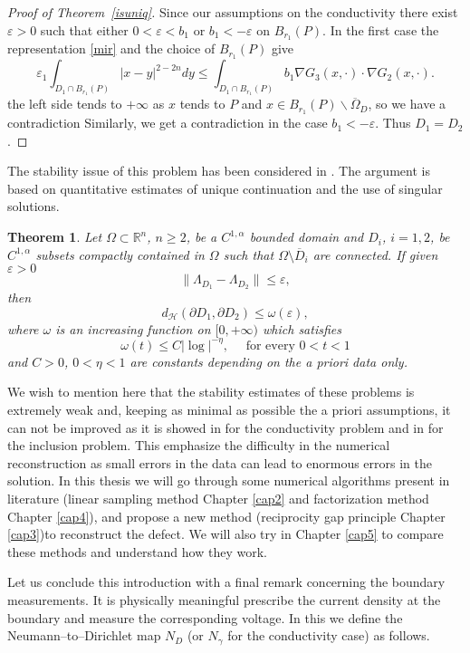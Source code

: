 \documentclass[10pt, a4paper, twoside, openright]{book}
\theoremstyle{definition}
\theoremstyle{plain}
\newtheorem{theorem}[subsection]{Theorem}
\theoremstyle{plain}
\theoremstyle{plain}
\theoremstyle{plain}
\theoremstyle{plain}
\theoremstyle{plain}
\theoremstyle{plain}
\theoremstyle{plain}
\begin{document}
\begin{proof}[Proof of Theorem~\ref{isuniq}]
Since our assumptions on the conductivity there exist $\varepsilon>0$ such that
either $0<\varepsilon<b_1$ or $b_1<-\varepsilon$ on $B_{r_1}(P)$.
In the first case the representation \eqref{mir} and the choice of
$B_{r_1}(P)$ give
$$\varepsilon_1\int_{D_1\cap B_{r_1}(P)}|x-y|^{2-2n}dy
\leq\int_{D_1\cap B_{r_1}(P)}b_1\nabla G_3(x,\cdot)\cdot\nabla G_2(x,\cdot).$$
the left side tends to $+\infty$ as $x$ tends to $P$
and $x\in B_{r_1}(P)\smallsetminus\overline\Omega_D$, so we have a contradiction
Similarly, we get a contradiction in the case $b_1<-\varepsilon$.
Thus $D_1=D_2$.
\end{proof}
The stability issue of this problem has been considered in \cite{Al-DC}.
The argument is based on quantitative estimates of unique continuation and the use of singular solutions.
\begin{theorem}
Let $\Omega\subset\mathbb R^n$, $n\geq2$, be a $C^{1,\alpha}$ bounded domain and
$D_i$, $i=1,2$, be $C^{1,\alpha}$ subsets compactly contained in $\Omega$ such that
$\Omega\setminus\overline D_i$ are connected. If given $\varepsilon>0$
$$\|\Lambda_{D_1}-\Lambda_{D_2}\|\leq\varepsilon,$$
then
$$d_\mathcal H(\partial D_1,\partial D_2)\leq\omega(\varepsilon),$$
where $\omega$ is an increasing function on $[0,+\infty)$ which satisfies
$$\omega(t)\leq C|\log|^{-\eta},\quad\textrm{ for every } 0<t<1$$
and $C>0$, $0<\eta<1$ are constants depending on the a priori data only.
\end{theorem}
We wish to mention here that the stability estimates of these problems is extremely weak
and, keeping as minimal as possible the a priori assumptions, it can not be improved as it
is showed in \cite{Ma} for the conductivity problem and in \cite{DC-Ro} for the inclusion problem.
This emphasize the difficulty in the numerical reconstruction as small errors in the data
can lead to enormous errors in the solution.
In this thesis we will go through some numerical algorithms present in literature
(linear sampling method Chapter \ref{cap2} and factorization method Chapter \ref{cap4}), 
and propose a new method (reciprocity gap principle Chapter \ref{cap3})to reconstruct the defect.
We will also try in Chapter \ref{cap5} to compare these methods and understand how they work.

Let us conclude this introduction with a final remark concerning the boundary measurements.
It is physically meaningful prescribe the current density at the boundary and measure the corresponding voltage.
In this we define the Neumann--to--Dirichlet map $N_D$ (or $N_\gamma$ for the conductivity case) as follows.
\end{document}
